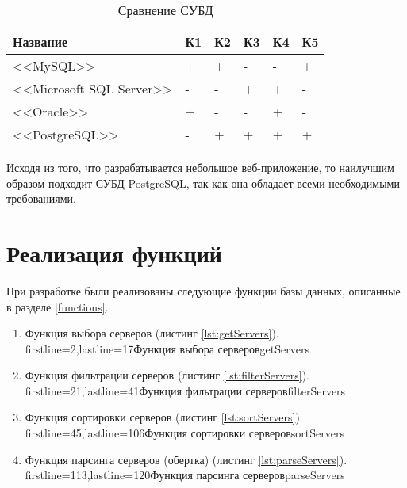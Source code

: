\captionsetup{justification=raggedleft,singlelinecheck=off}
\begin{table}[H]
    \centering
	\caption{Сравнение СУБД}
    \label{tbl:compare_subd}
	\begin{tabular}{|l|l|l|l|l|l|}
        \hline
        \textbf{Название} & \textbf{К1} & \textbf{К2} & \textbf{К3} & \textbf{К4} & \textbf{К5} \\ \hline

        <<MySQL>>                   & + & + & - & - & + \\ \hline
        <<Microsoft SQL Server>>    & - & - & + & + & - \\ \hline
        <<Oracle>>                  & + & - & - & + & - \\ \hline
        <<PostgreSQL>>             & - & + & + & + & + \\ \hline

    \end{tabular}
\end{table}

Исходя из того, что разрабатывается небольшое веб-приложение, то наилучшим образом подходит СУБД PostgreSQL, так как она обладает всеми необходимыми требованиями.


\section{Реализация функций}

При разработке были реализованы следующие функции базы данных, описанные в разделе \ref{functions}.

\begin{enumerate}
    \item Функция выбора серверов (листинг \ref{lst:getServers}).
            {firstline=2,lastline=17}{Функция выбора серверов}{getServers}{}

    \item Функция фильтрации серверов (листинг \ref{lst:filterServers}).
            {firstline=21,lastline=41}{Функция фильтрации серверов}{filterServers}{}

    \item Функция сортировки серверов (листинг \ref{lst:sortServers}).
            {firstline=45,lastline=106}{Функция сортировки серверов}{sortServers}{}

    \item Функция парсинга серверов (обертка) (листинг \ref{lst:parseServers}).
            {firstline=113,lastline=120}{Функция парсинга серверов}{parseServers}{}
\end{enumerate}


